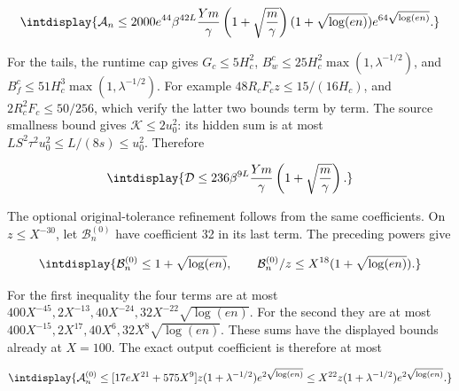 \begingroup\renewcommand{\theHequation}{intdisplay.623}
\begin{equation}
\intdisplay{
\mathcal A_n\le2000e^{44}\beta^{42L}\frac{Ym}{\gamma}
 \left(1+\sqrt{\frac m\gamma}\right)
 (1+\sqrt{\log(en)})e^{64\sqrt{\log(en)}}.
}
\label{int:eq-0264-harmonic-numerical-prefactor-bound}
\end{equation}
\endgroup


For the tails, the runtime cap gives \(G_c\le5H_c^2\), \(B_w^c\le25H_c^2\max(1,\allowbreak \lambda^{-1/2})\), and \(B_f^c\le51H_c^3\max(1,\allowbreak \lambda^{-1/2})\). For example \(48R_cF_cz\le15/(16H_c)\), and \(2R_c^2F_c\le50/256\), which verify the latter two bounds term by term. The source smallness bound gives \(\mathcal K\le2u_0^2\): its hidden sum is at most \(LS^2\tau^2u_0^2\le L/(8s)\le u_0^2\). Therefore


\begingroup\renewcommand{\theHequation}{intdisplay.624}
\begin{equation}
\intdisplay{
\mathcal D\le236\beta^{9L}\frac{Ym}{\gamma}
                        \left(1+\sqrt{\frac m\gamma}\right).
}
\label{int:eq-0265-harmonic-numerical-tail-bound}
\end{equation}
\endgroup


The optional original-tolerance refinement follows from the same coefficients. On \(z\le X^{-30}\), let \(\mathcal B_n^{(0)}\) have coefficient 32 in its last term. The preceding powers give


\begingroup\renewcommand{\theHequation}{intdisplay.625}
\begin{equation*}
\intdisplay{
\mathcal B_n^{(0)}\le1+\sqrt{\log(en)},\qquad
\mathcal B_n^{(0)}/z\le X^{18}(1+\sqrt{\log(en)}).
}
\end{equation*}
\endgroup


For the first inequality the four terms are at most \(400X^{-45},\allowbreak 2X^{-13},\allowbreak 40X^{-24},\allowbreak 32X^{-22}\sqrt{\log(en)}\). For the second they are at most \(400X^{-15},\allowbreak 2X^{17},\allowbreak 40X^6,\allowbreak 32X^8\sqrt{\log(en)}\). These sums have the displayed bounds already at \(X=100\). The exact output coefficient is therefore at most


\begingroup\renewcommand{\theHequation}{intdisplay.626}
\begin{equation*}
\intdisplay{
\mathcal A_n^{(0)}\le
 [17eX^{21}+575X^9]z(1+\lambda^{-1/2})e^{2\sqrt{\log(en)}}
 \le X^{22}z(1+\lambda^{-1/2})e^{2\sqrt{\log(en)}}.
}
\end{equation*}
\endgroup

